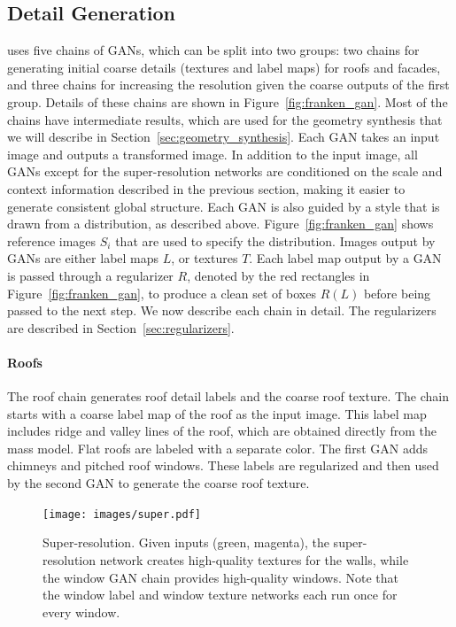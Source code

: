 \subsection{Detail Generation}
\label{sec:detail_generation}
\systemName uses five chains of GANs, which can be split into two groups: two chains for generating initial coarse details (textures and label maps) for roofs and facades, and three chains for increasing the resolution given the coarse outputs of the first group. Details of these chains are shown in Figure~\ref{fig:franken_gan}. Most of the chains have intermediate results, which are used for the geometry synthesis that we will describe in Section~\ref{sec:geometry_synthesis}. Each GAN takes an input image and outputs a transformed image. In addition to the input image, all GANs except for the super-resolution networks are conditioned on the scale and context information described in the previous section, making it easier to generate consistent global structure. Each GAN is also guided by a style that is drawn from a distribution, as described above. Figure~\ref{fig:franken_gan} shows reference images $S_i$ that are used to specify the distribution. Images output by GANs are either label maps $L$, or textures $T$. Each label map output by a GAN is passed through a regularizer $R$, denoted by the red rectangles in Figure~\ref{fig:franken_gan}, to produce a clean set of boxes $R(L)$ before being passed to the next step. We now describe each chain in detail. The regularizers are described in Section~\ref{sec:regularizers}.

\paragraph{Roofs}
The roof chain generates roof detail labels and the coarse roof texture. The chain starts with a coarse label map  of the roof as the input image. This label map includes ridge and valley lines of the roof, which are obtained directly from the mass model. Flat roofs are labeled with a separate color. The first GAN adds chimneys and pitched roof windows. These labels are regularized and then used by the second GAN to generate the coarse roof texture.

\begin{figure}[t]
    \centering
    \texttt{[image: images/super.pdf]}
    \caption{Super-resolution. Given inputs (green, magenta), the super-resolution network creates high-quality textures for the walls, while the window GAN chain provides high-quality windows. Note that the window label and window texture networks each run once for every window.}
    \vspace{-5pt}
    \label{fig:super}
\end{figure}


